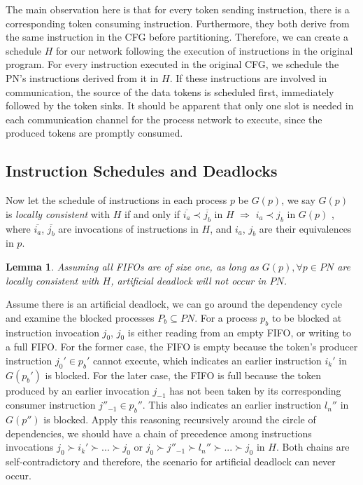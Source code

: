 \documentclass{sig-alternate}
\newtheorem{lemma}[theorem]{Lemma}
\begin{document}
The main observation here is that for every token sending instruction, there is a corresponding token consuming instruction. Furthermore, they both derive from the same instruction in the CFG before partitioning. Therefore, we can create a schedule $H$ for our network following the execution of instructions in the original program. For every instruction executed in the original CFG, we schedule the PN's instructions derived from it in $H$. If these instructions are involved in communication, the source of the data tokens is scheduled first, immediately followed by the token sinks. It should be apparent that only one slot is needed
in each communication channel for the process network to execute, since the produced tokens are promptly consumed.

\subsection{Instruction Schedules and Deadlocks}
Now let the schedule of instructions in each process $p$ be $G(p)$, we say $G(p)$ is \textit{locally consistent} with $H$ if and only if 
$\overline{i_a} \prec \overline{j_b}$ in $H$ $\Rightarrow$ $i_a \prec j_b$ in $G(p)$
, where $\overline{i_a}$, $\overline{j_b}$ are invocations of instructions in $H$, and $i_a$, $j_b$ are their equivalences in $p$. 
\begin{lemma}
\label{nondeadlock}
Assuming 
all FIFOs are of size one,
as long as $G(p), \forall p \in PN$ are locally consistent with $H$,
artificial deadlock will not occur in $PN$. 
\end{lemma}

Assume there is an artificial deadlock, we can go around the dependency
cycle and examine the blocked processes $P_b \subseteq PN$. For a process $p_b$
to be blocked at instruction  invocation $j_0$, $j_0$ is either reading from an empty FIFO, or writing to a full FIFO. For the former case, the FIFO is empty because the token's producer instruction $j_0' \in p_b'$ cannot execute, which indicates an earlier instruction  $i_k'$ in $G(p_b')$ is blocked. For the later case, the FIFO is full because the token produced by an earlier invocation $j_{-1}$ has not been taken by its corresponding consumer instruction $j''_{-1} \in p_b''$. This also indicates an earlier instruction $l_n''$ in $G(p'')$ is blocked. Apply this reasoning recursively around the circle of dependencies,
we should have a chain of precedence among instructions invocations $j_0 \succ i_k' \succ ... \succ j_0$
or $j_0 \succ j''_{-1} \succ l_n'' \succ ... \succ j_0$ in $H$. %
Both chains are self-contradictory and therefore, the scenario for artificial deadlock can never occur. 
\end{document}
